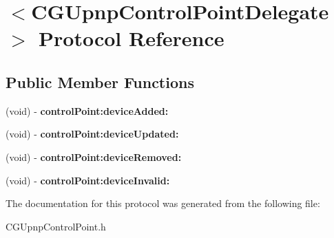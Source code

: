 \hypertarget{protocol_c_g_upnp_control_point_delegate-p}{\section{$<$C\-G\-Upnp\-Control\-Point\-Delegate$>$ Protocol Reference}
\label{protocol_c_g_upnp_control_point_delegate-p}
}
\subsection*{Public Member Functions}
\begin{DoxyCompactItemize}
\item 
\hypertarget{protocol_c_g_upnp_control_point_delegate-p_a1be29671cfc3192cff35aa4e829810e3}{(void) -\/ {\bfseries control\-Point\-:device\-Added\-:}}\label{protocol_c_g_upnp_control_point_delegate-p_a1be29671cfc3192cff35aa4e829810e3}

\item 
\hypertarget{protocol_c_g_upnp_control_point_delegate-p_a731ee152e95467b7cf8e67fa98094c52}{(void) -\/ {\bfseries control\-Point\-:device\-Updated\-:}}\label{protocol_c_g_upnp_control_point_delegate-p_a731ee152e95467b7cf8e67fa98094c52}

\item 
\hypertarget{protocol_c_g_upnp_control_point_delegate-p_af5515de19b445fa37f5f8ec27770489e}{(void) -\/ {\bfseries control\-Point\-:device\-Removed\-:}}\label{protocol_c_g_upnp_control_point_delegate-p_af5515de19b445fa37f5f8ec27770489e}

\item 
\hypertarget{protocol_c_g_upnp_control_point_delegate-p_a7158ab59eb7370caaf8c691a4f77473b}{(void) -\/ {\bfseries control\-Point\-:device\-Invalid\-:}}\label{protocol_c_g_upnp_control_point_delegate-p_a7158ab59eb7370caaf8c691a4f77473b}

\end{DoxyCompactItemize}


The documentation for this protocol was generated from the following file\-:\begin{DoxyCompactItemize}
\item 
C\-G\-Upnp\-Control\-Point.\-h\end{DoxyCompactItemize}
